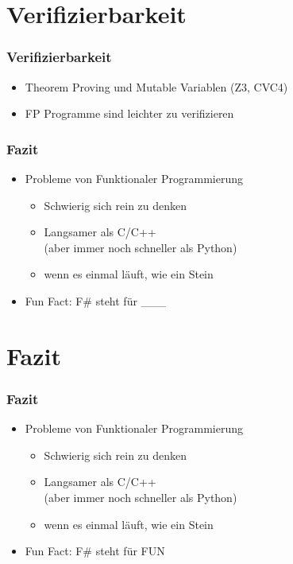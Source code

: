 \documentclass{beamer}
\begin{document}
\section{Verifizierbarkeit}

\begin{frame}
    \frametitle{Verifizierbarkeit}
    \begin{itemize}
        \item Theorem Proving und Mutable Variablen (Z3, CVC4)
        \item FP Programme sind leichter zu verifizieren
    \end{itemize}
\end{frame}

\begin{frame}
    \frametitle{Fazit}
    \begin{itemize}
        \item Probleme von Funktionaler Programmierung
        \begin{itemize}
            \item Schwierig sich rein zu denken
            \item Langsamer als C/C++ \\
            {\footnotesize(aber immer noch schneller als Python)}
            \item wenn es einmal läuft, wie ein Stein
        \end{itemize}
        \item Fun Fact: F\# steht für \_\_\_
    \end{itemize}
\end{frame}


\section{Fazit}

\begin{frame}
    \frametitle{Fazit}
    \begin{itemize}
        \item Probleme von Funktionaler Programmierung
        \begin{itemize}
            \item Schwierig sich rein zu denken
            \item Langsamer als C/C++ \\
            {\footnotesize(aber immer noch schneller als Python)}
            \item wenn es einmal läuft, wie ein Stein
        \end{itemize}
        \item Fun Fact: F\# steht für FUN
    \end{itemize}
\end{frame}
\end{document}
